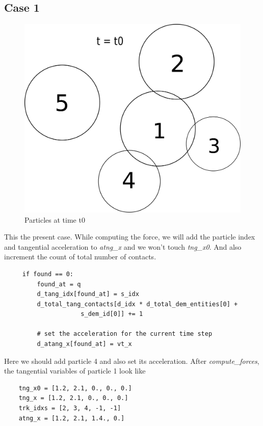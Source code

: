 \documentclass[11pt]{article}
\begin{document}
\subsection{Case 1}
\label{sec:orgd62f31e}
\begin{figure}[H]
\centering
\includegraphics[scale=0.30]{dem_physics_figures/case1_t0.png}
\caption{Particles at time t0\label{fig:case1_t0}}
\end{figure}

This the present case. While computing the force, we will add the particle index
and tangential acceleration to \emph{atng\_x} and we won't touch \emph{tng\_x0}. And also increment
the count of total number of contacts.

\begin{verbatim}
	 if found == 0:
	     found_at = q
	     d_tang_idx[found_at] = s_idx
	     d_total_tang_contacts[d_idx * d_total_dem_entities[0] +
				     s_dem_id[0]] += 1

	     # set the acceleration for the current time step
	     d_atang_x[found_at] = vt_x
\end{verbatim}


Here we should add particle 4 and also set its acceleration. After \emph{compute\_forces},
the tangential variables of particle 1 look like

\begin{verbatim}
	tng_x0 = [1.2, 2.1, 0., 0., 0.]
	tng_x = [1.2, 2.1, 0., 0., 0.]
	trk_idxs = [2, 3, 4, -1, -1]
	atng_x = [1.2, 2.1, 1.4., 0.]
\end{verbatim}
\end{document}
